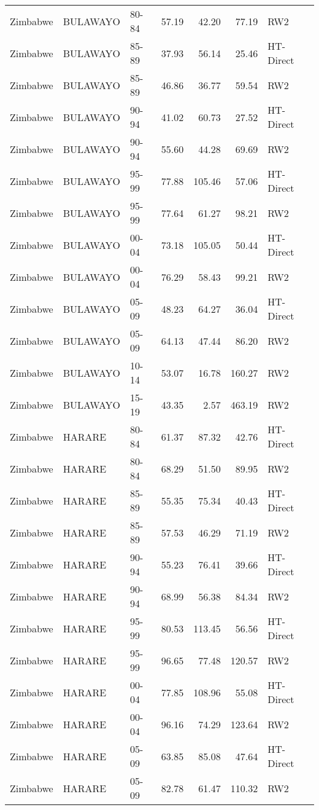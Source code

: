 \begin{longtable}{lllrrrl}
  Zimbabwe & BULAWAYO & 80-84 & 57.19 & 42.20 & 77.19 & RW2 \\ 
  Zimbabwe & BULAWAYO & 85-89 & 37.93 & 56.14 & 25.46 & HT-Direct \\ 
  Zimbabwe & BULAWAYO & 85-89 & 46.86 & 36.77 & 59.54 & RW2 \\ 
  Zimbabwe & BULAWAYO & 90-94 & 41.02 & 60.73 & 27.52 & HT-Direct \\ 
  Zimbabwe & BULAWAYO & 90-94 & 55.60 & 44.28 & 69.69 & RW2 \\ 
  Zimbabwe & BULAWAYO & 95-99 & 77.88 & 105.46 & 57.06 & HT-Direct \\ 
  Zimbabwe & BULAWAYO & 95-99 & 77.64 & 61.27 & 98.21 & RW2 \\ 
  Zimbabwe & BULAWAYO & 00-04 & 73.18 & 105.05 & 50.44 & HT-Direct \\ 
  Zimbabwe & BULAWAYO & 00-04 & 76.29 & 58.43 & 99.21 & RW2 \\ 
  Zimbabwe & BULAWAYO & 05-09 & 48.23 & 64.27 & 36.04 & HT-Direct \\ 
  Zimbabwe & BULAWAYO & 05-09 & 64.13 & 47.44 & 86.20 & RW2 \\ 
  Zimbabwe & BULAWAYO & 10-14 & 53.07 & 16.78 & 160.27 & RW2 \\ 
  Zimbabwe & BULAWAYO & 15-19 & 43.35 & 2.57 & 463.19 & RW2 \\ 
  Zimbabwe & HARARE & 80-84 & 61.37 & 87.32 & 42.76 & HT-Direct \\ 
  Zimbabwe & HARARE & 80-84 & 68.29 & 51.50 & 89.95 & RW2 \\ 
  Zimbabwe & HARARE & 85-89 & 55.35 & 75.34 & 40.43 & HT-Direct \\ 
  Zimbabwe & HARARE & 85-89 & 57.53 & 46.29 & 71.19 & RW2 \\ 
  Zimbabwe & HARARE & 90-94 & 55.23 & 76.41 & 39.66 & HT-Direct \\ 
  Zimbabwe & HARARE & 90-94 & 68.99 & 56.38 & 84.34 & RW2 \\ 
  Zimbabwe & HARARE & 95-99 & 80.53 & 113.45 & 56.56 & HT-Direct \\ 
  Zimbabwe & HARARE & 95-99 & 96.65 & 77.48 & 120.57 & RW2 \\ 
  Zimbabwe & HARARE & 00-04 & 77.85 & 108.96 & 55.08 & HT-Direct \\ 
  Zimbabwe & HARARE & 00-04 & 96.16 & 74.29 & 123.64 & RW2 \\ 
  Zimbabwe & HARARE & 05-09 & 63.85 & 85.08 & 47.64 & HT-Direct \\ 
  Zimbabwe & HARARE & 05-09 & 82.78 & 61.47 & 110.32 & RW2 \\ 

\end{longtable}
